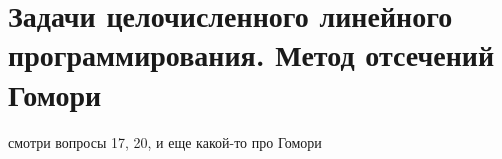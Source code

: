 \documentclass[17pt]{extarticle}
\begin{document}
\section{Задачи целочисленного линейного программирования. Метод отсечений Гомори}
смотри вопросы 17, 20, и еще какой-то про Гомори
\end{document}
